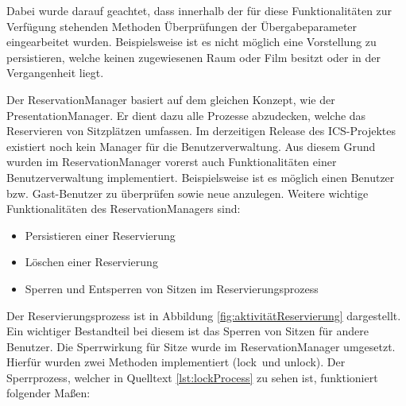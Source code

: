 	Dabei wurde darauf geachtet, dass innerhalb der für diese Funktionalitäten zur Verfügung stehenden Methoden Überprüfungen der Übergabeparameter eingearbeitet wurden. Beispielsweise ist es nicht möglich eine Vorstellung zu persistieren, welche keinen zugewiesenen Raum oder Film besitzt oder in der Vergangenheit liegt.
	
	Der ReservationManager basiert auf dem gleichen Konzept, wie der PresentationManager. Er dient dazu alle Prozesse abzudecken, welche das Reservieren von Sitzplätzen umfassen. Im derzeitigen Release des \ac{ICS}-Projektes existiert noch kein Manager für die Benutzerverwaltung. Aus diesem Grund wurden im ReservationManager vorerst auch Funktionalitäten einer Benutzerverwaltung implementiert. Beispielsweise ist es möglich einen Benutzer bzw. Gast-Benutzer zu überprüfen sowie neue anzulegen. Weitere wichtige Funktionalitäten des ReservationManagers sind: 
	
	\begin{itemize}
		\setlength\itemsep{-0.5em}
		\item Persistieren einer Reservierung
		\item Löschen einer Reservierung
		\item Sperren und Entsperren von Sitzen im Reservierungsprozess
	\end{itemize}
	
	Der Reservierungsprozess ist in Abbildung \vref{fig:aktivitätReservierung} dargestellt. Ein wichtiger Bestandteil bei diesem ist das Sperren von Sitzen für andere Benutzer. Die Sperrwirkung für Sitze wurde im ReservationManager umgesetzt. Hierfür wurden zwei Methoden implementiert (\glqq lock\grqq \, und \glqq unlock\grqq). Der Sperrprozess, welcher in Quelltext \ref{lst:lockProcess} zu sehen ist, funktioniert folgender Maßen:
	
